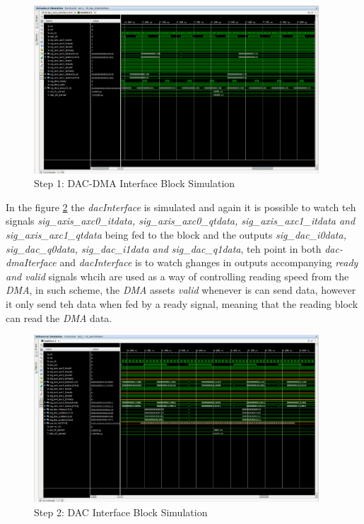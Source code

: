 \begin{figure}[htbp]
    \centering
    \includegraphics[width=0.95\textwidth]{./figures/dac_dmaInterface}
    \caption{ Step 1: DAC-DMA Interface Block Simulation
    \label{fig:simdacdma}}
\end{figure}

 In the figure \ref{fig:simdac} the \textit{dacInterface} is simulated and again
 it is possible to watch teh signals \textit{sig\_axis\_axc0\_itdata,
 sig\_axis\_axc0\_qtdata, sig\_axis\_axc1\_itdata and sig\_axis\_axc1\_qtdata} being fed
 to the block and the outputs \textit{sig\_dac\_i0data, sig\_dac\_q0data,
 sig\_dac\_i1data and sig\_dac\_q1data}, teh point in both \textit{dac-dmaIterface}
 and \textit{dacInterface} is to watch ghanges in outputs accompanying
 \textit{ready and valid} signals whcih are used as a way of controlling reading
 speed from the \textit{DMA}, in such scheme, the \textit{DMA} assets
 \textit{valid} whenever is can send data, however it only send teh data when
 fed by a ready signal, meaning that the reading block can read the \textit{DMA}
 data.

\begin{figure}[htbp]
    \centering
    \includegraphics[width=0.95\textwidth]{./figures/dacInterface}
    \caption{ Step 2: DAC Interface Block Simulation
    \label{fig:simdac}}
\end{figure}

